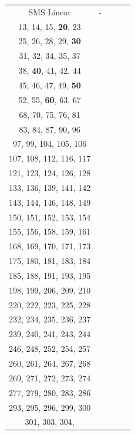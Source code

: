\documentclass{article}
\begin{document}
\begin{table}[h]
\begin{tabular}{c|c|c|c|c}
SMS Linear & - & \begin{tabular}[c]{@{}c@{}}\textbf{1}, 4, \textbf{10}, 11, 12\\13, 14, 15, \textbf{20}, 23\\25, 26, 28, 29, \textbf{30}\\31, 32, 34, 35, 37\\38, \textbf{40}, 41, 42, 44\\45, 46, 47, 49, \textbf{50}\\52, 55, \textbf{60}, 63, 67\\68, 70, 75, 76, 81\\83, 84, 87, 90, 96\\97, 99, 104, 105, 106\\107, 108, 112, 116, 117\\121, 123, 124, 126, 128\\133, 136, 139, 141, 142\\143, 144, 146, 148, 149\\150, 151, 152, 153, 154\\155, 156, 158, 159, 161\\168, 169, 170, 171, 173\\175, 180, 181, 183, 184\\185, 188, 191, 193, 195\\198, 199, 206, 209, 210\\220, 222, 223, 225, 228\\232, 234, 235, 236, 237\\239, 240, 241, 243, 244\\246, 248, 252, 254, 257\\260, 261, 264, 267, 268\\269, 271, 272, 273, 274\\277, 279, 280, 283, 286\\293, 295, 296, 299, 300\\301, 303, 304,
\end{tabular}
\end{table}
\end{document}

